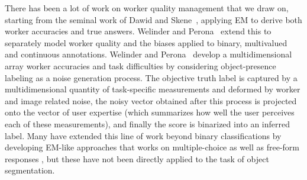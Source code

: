 \documentclass[letterpaper]{article} %
\begin{document}
\par There has been a lot of work on worker quality
management that we draw on, starting from the seminal work of Dawid and Skene~, applying
EM to derive both worker accuracies and true answers. 
Welinder and Perona~ extend this to separately model
worker quality and the biases applied to binary, multivalued and continuous annotations. 
Welinder and Perona~ develop a multidimensional array 
worker accuracies and task difficulties by considering 
object-presence labeling as a noise generation process. 
The objective truth label is captured by a multidimensional quantity of task-specific measurements and deformed by worker and image related noise, the noisy vector obtained after this process is projected onto the vector of user expertise (which summarizes how well the user perceives each of these measurements), and finally the score is binarized into an inferred label. 
Many have extended this line of work beyond binary classifications by developing EM-like approaches that works on multiple-choice \cite{Karger2013} as well as free-form responses \cite{Lin2012}, but these have not been directly applied to the task of object segmentation.
\end{document}

